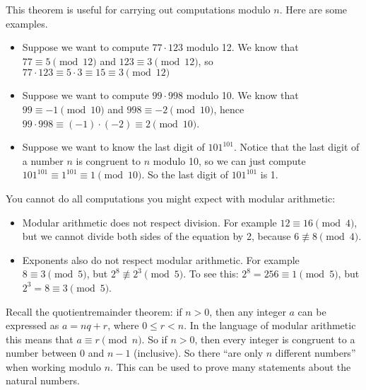 \documentclass[letterpaper,10pt,english]{sphinxmanual}
\begin{document}
\sphinxAtStartPar
This theorem is useful for carrying out computations modulo \(n\). Here are some examples.
\begin{itemize}
\item {} 
\sphinxAtStartPar
Suppose we want to compute \(77 \cdot 123\) modulo 12. We know that \(77 \equiv 5 \pmod{12}\) and \(123 \equiv 3 \pmod{12}\), so \(77 \cdot 123 \equiv 5 \cdot 3 \equiv 15 \equiv 3 \pmod{12}\)

\item {} 
\sphinxAtStartPar
Suppose we want to compute \(99 \cdot 998\) modulo 10. We know that \(99 \equiv -1\pmod{10}\) and \(998 \equiv -2 \pmod{10}\), hence \(99 \cdot 998 \equiv (-1) \cdot (-2) \equiv 2 \pmod{10}\).

\item {} 
\sphinxAtStartPar
Suppose we want to know the last digit of \(101^{101}\). Notice that the last digit of a number \(n\) is congruent to \(n\) modulo 10, so we can just compute \(101^{101} \equiv 1^{101} \equiv 1 \pmod{10}\). So the last digit of \(101^{101}\) is 1.

\end{itemize}

\sphinxAtStartPar
{} You cannot do all computations you might expect with modular arithmetic:
\begin{itemize}
\item {} 
\sphinxAtStartPar
Modular arithmetic does not respect division. For example \(12 \equiv 16 \pmod{4}\), but we cannot divide both sides of the equation by 2, because \(6 \not\equiv 8 \pmod{4}\).

\item {} 
\sphinxAtStartPar
Exponents also do not respect modular arithmetic. For example \(8 \equiv 3 \pmod{5}\), but \(2^8 \not\equiv 2^3 \pmod{5}\). To see this: \(2^8 = 256 \equiv 1 \pmod{5}\), but \(2^3 = 8 \equiv 3 \pmod{5}\).

\end{itemize}

\sphinxAtStartPar
Recall the quotient\sphinxhyphen{}remainder theorem: if \(n > 0\), then any integer \(a\) can be expressed as \(a = n q + r\), where \(0 \le r < n\). In the language of modular arithmetic this means that \(a \equiv r \pmod{n}\). So if \(n > 0\), then every integer is congruent to a number between 0 and \(n-1\) (inclusive). So there “are only \(n\) different numbers” when working modulo \(n\). This can be used to prove many statements about the natural numbers.
\end{document}
